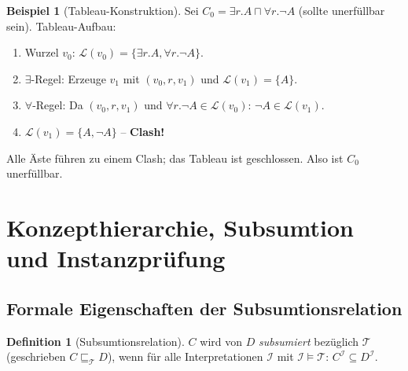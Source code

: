 ﻿\documentclass[a4paper,12pt]{article}
\theoremstyle{definition}
\newtheorem{definition}{Definition}[section]
\newtheorem{beispiel}{Beispiel}[section]
\theoremstyle{plain}
\theoremstyle{remark}
\newcommand{\Tbox}{\ensuremath{\mathcal{T}}}
\newcommand{\interp}[1]{\ensuremath{\mathcal{#1}}}
\begin{document}
\begin{beispiel}[Tableau-Konstruktion]
Sei $C_0 = \exists r.A \sqcap \forall r.\neg A$ (sollte unerf{\"{u}}llbar sein).
Tableau-Aufbau:
\begin{enumerate}
  \item Wurzel $v_0$: $\mathcal{L}(v_0) = \{\exists r.A, \forall r.\neg A\}$.
  \item $\exists$-Regel: Erzeuge $v_1$ mit $(v_0, r, v_1)$ und
        $\mathcal{L}(v_1) = \{A\}$.
  \item $\forall$-Regel: Da $(v_0,r,v_1)$ und $\forall r.\neg A \in \mathcal{L}(v_0)$:
        $\neg A \in \mathcal{L}(v_1)$.
  \item $\mathcal{L}(v_1) = \{A, \neg A\}$ -- \textbf{Clash!}
\end{enumerate}
Alle {\"{A}}ste f{\"{u}}hren zu einem Clash; das Tableau ist geschlossen.
Also ist $C_0$ unerf{\"{u}}llbar. \checkmark
\end{beispiel}

\section{Konzepthierarchie, Subsumtion und Instanzpr{\"u}fung}
\label{sec:subsumtion}

\subsection{Formale Eigenschaften der Subsumtionsrelation}

\begin{definition}[Subsumtionsrelation]
$C$ wird von $D$ \emph{subsumiert} bez{\"{u}}glich $\Tbox$
(geschrieben $C \sqsubseteq_\Tbox D$), wenn f{\"{u}}r alle
Interpretationen $\interp{I}$ mit $\interp{I} \models \Tbox$:
$C^\interp{I} \subseteq D^\interp{I}$.
\end{definition}
\end{document}
